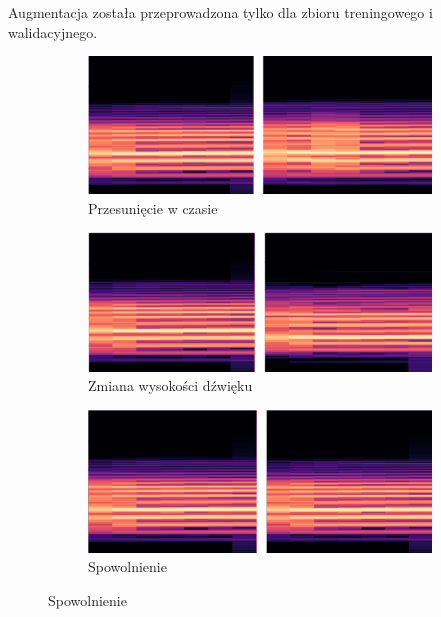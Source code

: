 Augmentacja została przeprowadzona tylko dla zbioru treningowego i walidacyjnego.

\begin{figure}[ht]
    \centering
    \begin{subfigure}{0.68\textwidth}
        \includegraphics[width=\linewidth]{./img/augmentation/rolled}
        \caption{Przesunięcie w czasie\@}
        \label{fig:roll}
    \end{subfigure}

    \begin{subfigure}{0.68\textwidth}
        \includegraphics[width=\linewidth]{./img/augmentation/pitch}
        \caption{Zmiana wysokości dźwięku\@}
        \label{fig:pitch}
    \end{subfigure}

    \begin{subfigure}{0.68\textwidth}
        \includegraphics[width=\linewidth]{./img/augmentation/slow}
        \caption{Spowolnienie\@}
        \label{fig:slow}
    \end{subfigure}


\end{figure}
